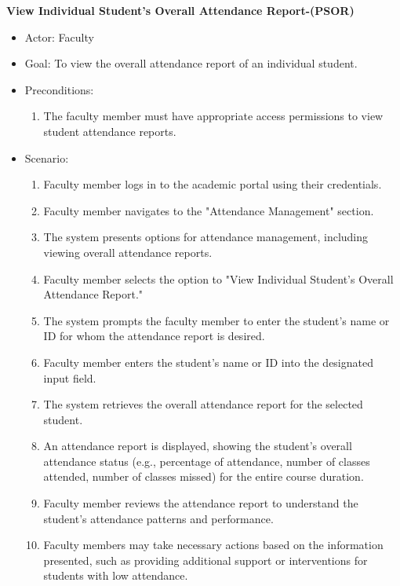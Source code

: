 \documentclass[letterpaper,12pt,oneside,listof=totoc]{scrreprt}
\begin{document}
\hfill \break
\textbf{View Individual Student's Overall Attendance Report-(PSOR)}
\begin{itemize}
    \item Actor: Faculty
    \item Goal: To view the overall attendance report of an individual student.
    \item Preconditions:
    \begin{enumerate}
        \item The faculty member must have appropriate access permissions to view student attendance reports.
    \end{enumerate}
    \item Scenario:
    \begin{enumerate}
        \item Faculty member logs in to the academic portal using their credentials.
        \item Faculty member navigates to the "Attendance Management" section.
        \item The system presents options for attendance management, including viewing overall attendance reports.
        \item Faculty member selects the option to "View Individual Student’s Overall Attendance Report."
        \item The system prompts the faculty member to enter the student's name or ID for whom the attendance report is desired.
        \item Faculty member enters the student's name or ID into the designated input field.
        \item The system retrieves the overall attendance report for the selected student.
        \item An attendance report is displayed, showing the student's overall attendance status (e.g., percentage of attendance, number of classes attended, number of classes missed) for the entire course duration.
        \item Faculty member reviews the attendance report to understand the student's attendance patterns and performance.
        \item Faculty members may take necessary actions based on the information presented, such as providing additional support or interventions for students with low attendance.
    \end{enumerate}
\end{itemize}
\end{document}
